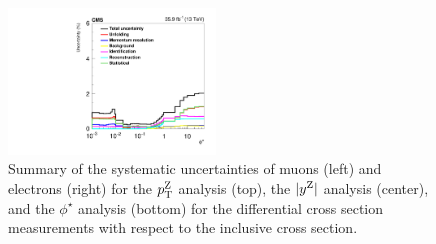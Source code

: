 \begin{figure}
        \includegraphics[width=0.49\textwidth]{figures/zpt/histoUnfolding_XSRatioSystPhiStar_nsel1_dy3.pdf}
	\caption{Summary of the systematic uncertainties of muons (left) and electrons (right) 
	for the $p_{\mathrm{T}}^{\mathrm{Z}}$ analysis (top), the $|y^{\mathrm{Z}}|$ analysis (center), and the $\phi^\star$ analysis (bottom) 
	for the differential cross section measurements with respect to the inclusive cross section.}
	\label{fig:zpt_syst_xratio}
\end{figure}
